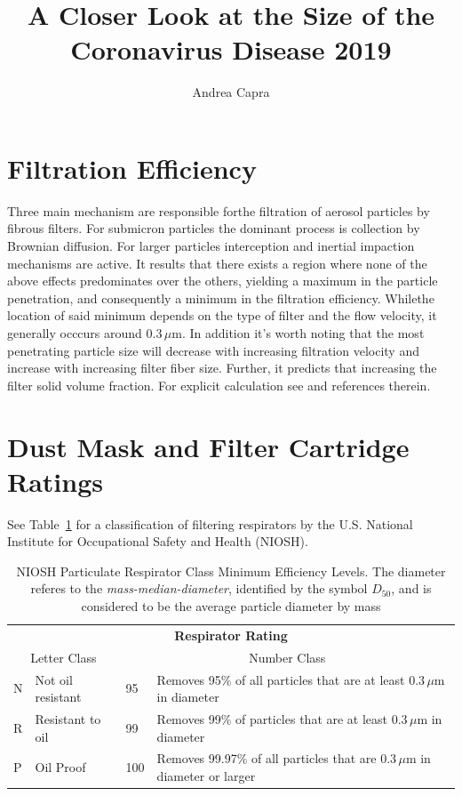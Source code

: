 \documentclass[10pt]{article} %
\title{A Closer Look at the Size of the Coronavirus Disease 2019}
\author{Andrea Capra}
\begin{document}
\maketitle

\section{Filtration Efficiency}
Three main mechanism are responsible forthe filtration of aerosol particles by fibrous filters. For submicron particles the dominant process is collection by Brownian diffusion. For larger particles interception and inertial impaction mechanisms are active. It results that there exists a region where none of the above effects predominates over the others, yielding a maximum in the particle penetration, and consequently a minimum in the filtration efficiency. Whilethe location of said minimum depends on the type of filter and the flow velocity, it generally occcurs around $0.3\,\mu$m. In addition it's worth noting that the most penetrating particle size will decrease with increasing filtration velocity and increase with increasing filter fiber size. Further, it predicts that increasing the filter solid volume fraction. For explicit calculation see \cite{lee1980} and references therein.

\section{Dust Mask and Filter Cartridge Ratings}

See Table~\ref{tab:respirator_rating} for a classification of filtering respirators by the U.S. National Institute for Occupational Safety and Health (NIOSH). 

\begin{table}[h!]
  \begin{center}
    \caption{NIOSH Particulate Respirator Class Minimum Efficiency Levels. The diameter referes to the \textit{mass-median-diameter}, identified by the symbol $D_{50}$, and is considered to be the average particle diameter by mass}
    \label{tab:respirator_rating}
    \begin{tabular}{p{}p{}|p{}p{}}
      \toprule %
      \multicolumn{4}{c}{\textbf{Respirator Rating}}\\
	\multicolumn{2}{c}{Letter Class}&\multicolumn{2}{c}{Number Class}\\
       \midrule %
	 N & Not oil resistant  & 95 & Removes 95\% of all particles that are at least $0.3\,\mu$m in diameter\\
           R & Resistant to oil    & 99 & Removes 99\% of particles that are at least $0.3\,\mu$m in diameter\\
           P & Oil Proof              & 100 & Removes 99.97\% of all particles that are $0.3\,\mu$m in diameter or larger\\
     \bottomrule %
    \end{tabular}
  \end{center}
\end{table}
\end{document}
